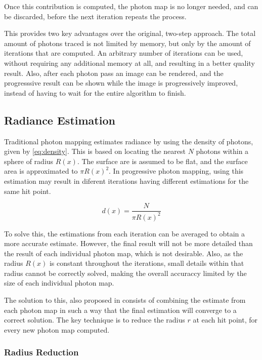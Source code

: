 \documentclass[main.tex]{subfiles}
\begin{document}
Once this contribution is computed, the photon map is no longer needed, and can be discarded, before the next iteration repeats the process.

This provides two key advantages over the original, two-step approach. The total amount of photons traced is not limited by memory, but only by the amount of iterations that are computed. An arbitrary number of iterations can be used, without requiring any additional memory at all, and resulting in a better quality result. Also, after each photon pass an image can be rendered, and the progresssive result can be shown while the image is progressively improved, instead of having to wait for the entire algorithm to finish.


\subsection{Radiance Estimation}

Traditional photon mapping estimates radiance by using the density of photons, given by \cref{eq:density}. This is based on locating the nearest $N$ photons within a sphere of radius $R(x)$. The surface are is assumed to be flat, and the surface area is approximated to $\pi R(x)^{2}$. In progressive photon mapping, using this estimation may result in diferent iterations having different estimations for the same hit point.

\begin{figure}[!htp]
  \begin{equation}
    d(x) = \frac{N}{\pi R(x)^{2}}
  \label{eq:density}
  \end{equation}
\end{figure}

To solve this, the estimations from each iteration can be averaged to obtain a more accurate estimate. However, the final result will not be more detailed than the result of each individual photon map, which is not desirable. Also, as the radius $R(x)$ is constant throughout the iterations, small details within that radius cannot be correctly solved, making the overall accuraccy limited by the size of each individual photon map.

The solution to this, also proposed in \cite{hachisuka2008progressive} consists of combining the estimate from each photon map in such a way that the final estimation will converge to a correct solution. The key technique is to reduce the radius $r$ at each hit point, for every new photon map computed.

\subsubsection{Radius Reduction}
\end{document}
